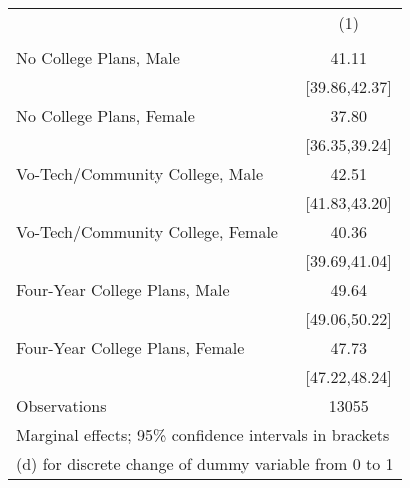 \begin{tabular}{l*{1}{c}}
\hline\hline
                    &\multicolumn{1}{c}{(1)}\\
                    &\multicolumn{1}{c}{}  \\
\hline
No College Plans, Male&                 41.11\\
                    &         [39.86,42.37]\\
No College Plans, Female&                 37.80\\
                    &         [36.35,39.24]\\
Vo-Tech/Community College, Male&                 42.51\\
                    &         [41.83,43.20]\\
Vo-Tech/Community College, Female&                 40.36\\
                    &         [39.69,41.04]\\
Four-Year College Plans, Male&                 49.64\\
                    &         [49.06,50.22]\\
Four-Year College Plans, Female&                 47.73\\
                    &         [47.22,48.24]\\
\hline
Observations        &                 13055\\
\hline\hline
\multicolumn{2}{l}{\footnotesize Marginal effects; 95\% confidence intervals in brackets}\\
\multicolumn{2}{l}{\footnotesize  (d) for discrete change of dummy variable from 0 to 1}\\
\end{tabular}
